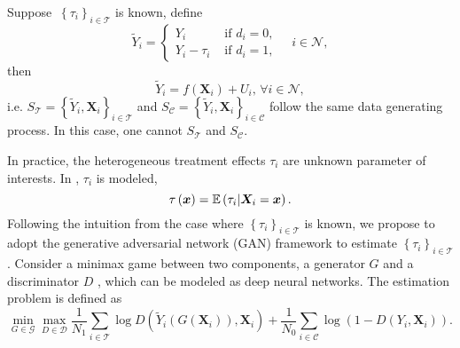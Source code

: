 Suppose \(\ \left\{ \tau _{i}  \right\} _{i \in \mathcal{T} }\)  is known, define
\begin{equation}
    \tilde{Y}_{i}  = \begin{cases}
        Y_{i}  & \text{ if }  d_{i} = 0, \\
        Y_i -\tau _{i} & \text{ if }  d _{i} = 1,
    \end{cases} \quad i \in \mathcal{N},
\end{equation}
then
\[
    \tilde{Y}_{i} = f\left( \bm{X} _{i}  \right) + U_i,\, \forall i\in \mathcal{N}, 
\]
i.e. \(S_{\mathcal{T} } = \left\{ \tilde{Y} _{i} , \bm{X} _{i}  \right\}_{i\in \mathcal{T} } \) and \(S_{\mathcal{\mathcal{C} } } = \left\{ \tilde{Y} _{i} , \bm{X} _{i}  \right\}_{i\in \mathcal{\mathcal{C} } } \) follow the same data generating process. In this case, one cannot \(S_{\mathcal{T} }\) and \(S_{\mathcal{C} }\). 

In practice, the heterogeneous treatment effects \(\tau _{i} \) are unknown parameter of interests. In \citet{wager/athey:2018:rf_hte}, \(\tau _{i} \) is modeled,
\[
    \tau \left( \bm{x} \right)  = \mathbb{E} \left( \tau _{i} \vert \bm{X}_{i} = \bm{x} \right).
\]
Following the intuition from the case where \(\left\{ \tau _{i}  \right\}_{i \in \mathcal{T} }\) is known, we propose to adopt the generative adversarial network (GAN) framework \citep{goodfellow:2014:GAN,kaji/manresa/pouliot:2022:adversarial_est} to estimate \(\left\{ \tau _{i}  \right\} _{i\in \mathcal{T} }\). Consider a minimax game between two components, a generator \(G\)  and a discriminator \(D\) , which can be modeled as deep neural networks. The estimation problem is defined as
\begin{equation}
    \min_{G\in \mathcal{G} } \max_{D \in \mathcal{D} } 
    \frac{1}{N_{1}} \sum_{i \in \mathcal{T} } 
        \log D\left( \tilde{Y} _{i} \left( G\left( \bm{X} _{i}  \right)  \right), \bm{X} _{i}  \right) + 
    \frac{1}{N_{0}} \sum_{i\in \mathcal{C} } \log \left( 
        1 - D\left( Y _{i} , \bm{X} _{i}  \right)
     \right).
\end{equation}








